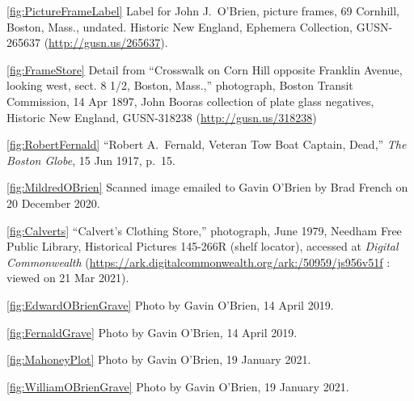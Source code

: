 \ref{fig:PictureFrameLabel} Label for John J.\ O'Brien, picture frames, 69 Cornhill, Boston, Mass., undated. Historic New England, Ephemera Collection, GUSN-265637 (\url{http://gusn.us/265637}).

\ref{fig:FrameStore} Detail from ``Crosswalk on Corn Hill opposite Franklin Avenue, looking west, sect. 8 1/2, Boston, Mass.,'' photograph, Boston Transit Commission, 14 Apr 1897, John Booras collection of plate glass negatives, Historic New England, GUSN-318238 (\url{http://gusn.us/318238}) 

\ref{fig:RobertFernald} ``Robert A.\ Fernald, Veteran Tow Boat Captain, Dead,'' \textit{The Boston Globe}, 15 Jun 1917, p.\ 15.

\ref{fig:MildredOBrien} Scanned image emailed to Gavin O'Brien by Brad French on 20 December 2020.

\ref{fig:Calverts} ``Calvert's Clothing Store,'' photograph, June 1979, Needham Free Public Library, Historical Pictures 145-266R (shelf locator), accessed at \textit{Digital Commonwealth} (\url{https://ark.digitalcommonwealth.org/ark:/50959/js956v51f} : viewed on 21 Mar 2021).

\ref{fig:EdwardOBrienGrave} Photo by Gavin O'Brien, 14 April 2019.

\ref{fig:FernaldGrave} Photo by Gavin O'Brien, 14 April 2019.

\ref{fig:MahoneyPlot} Photo by Gavin O'Brien, 19 January 2021.

\ref{fig:WilliamOBrienGrave} Photo by Gavin O'Brien, 19 January 2021.